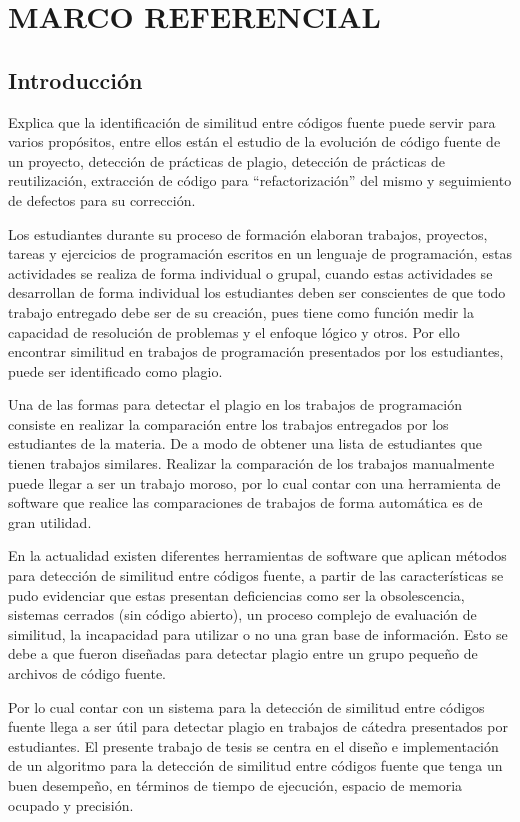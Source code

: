 \chapter{MARCO REFERENCIAL}

\section{Introducción}
\cite{unknown1} Explica que la identificación de similitud entre códigos fuente puede servir para varios propósitos, entre ellos están el estudio de la evolución de código fuente de un proyecto, detección de prácticas de plagio, detección de prácticas de reutilización, extracción de código para “refactorización” del mismo y seguimiento de defectos para su corrección.

Los estudiantes durante su proceso de formación elaboran trabajos, proyectos, tareas y ejercicios de programación escritos en un lenguaje de programación, estas actividades se realiza de forma individual o grupal, cuando estas actividades se desarrollan de forma individual los estudiantes deben ser conscientes de que todo trabajo entregado debe ser de su creación, pues tiene como función medir la capacidad de resolución de problemas y el enfoque lógico y otros. Por ello encontrar similitud en trabajos de programación presentados por los estudiantes, puede ser identificado como plagio.

Una de las formas para detectar el plagio en los trabajos de programación consiste en realizar la comparación entre los trabajos entregados por los estudiantes de la materia. De a modo de obtener una lista de estudiantes que tienen trabajos similares. Realizar la comparación de los trabajos manualmente puede llegar a ser un trabajo moroso, por lo cual contar con una herramienta de software que realice las comparaciones de trabajos de forma automática es de gran utilidad.

En la actualidad existen diferentes herramientas de software que aplican métodos para detección de similitud entre códigos fuente, a partir de las características se pudo evidenciar que estas presentan deficiencias como ser la obsolescencia, sistemas cerrados (sin código abierto), un proceso complejo de evaluación de similitud, la incapacidad para utilizar o no una gran base de información. Esto se debe a que fueron diseñadas para detectar plagio entre un grupo pequeño de archivos de código fuente.

Por lo cual contar con un sistema para la detección de similitud entre códigos fuente llega a ser útil para detectar plagio en trabajos de cátedra presentados por estudiantes. El presente trabajo de tesis se centra en el diseño e implementación de un algoritmo para la detección de similitud entre códigos fuente que tenga un buen desempeño, en términos de tiempo de ejecución, espacio de memoria ocupado y precisión.
